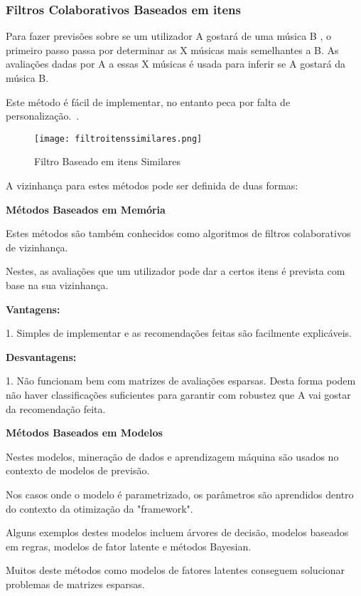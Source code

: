 \subsubsection{ Filtros Colaborativos Baseados em itens}
\hfill
 \par Para fazer previsões sobre se um utilizador A gostará de uma música B , o primeiro passo passa por determinar as X músicas mais semelhantes a B. As avaliações dadas por A a essas X músicas é usada para inferir se A gostará da música B.
 \par Este método é fácil de implementar, no entanto peca por falta de personalização.~\cite{ref_article1}.\newline

\begin{figure}[H]
  \centering
  \texttt{[image: filtroitenssimilares.png]}
  \caption{Filtro Baseado em itens Similares}
  \label{fig02}
\end{figure}


\par A vizinhança para estes métodos pode ser definida de duas formas:

\begin{center}
\normalsize{\bfseries Métodos Baseados em Memória}\hfill
\end{center}
 \par Estes métodos são também conhecidos como algoritmos de filtros colaborativos de vizinhança.
 \par Nestes, as avaliações que um utilizador pode dar a certos itens é prevista com base na sua vizinhança.\newline


\textbf{Vantagens:}\hfill
\hfill
\par 1. Simples de implementar e as recomendações feitas são facilmente explicáveis.\newline


\textbf{Desvantagens:}\hfill
\hfill
\par 1. Não funcionam bem com matrizes de avaliações esparsas. Desta forma podem não haver classificações suficientes para garantir com robustez que A vai gostar da recomendação feita.\newline

\begin{center}
\normalsize{\bfseries Métodos Baseados em Modelos}\hfill
\end{center}
\hfill
\par Nestes modelos, mineração de dados e aprendizagem máquina são usados no contexto de modelos de previsão.
\par Nos casos onde o modelo é parametrizado, os parâmetros são aprendidos dentro do contexto da otimização da "framework".
\par Alguns exemplos destes modelos incluem árvores de decisão, modelos baseados em regras, modelos de fator latente e métodos Bayesian.
\par Muitos deste métodos como modelos de fatores latentes conseguem solucionar problemas de matrizes esparsas.

